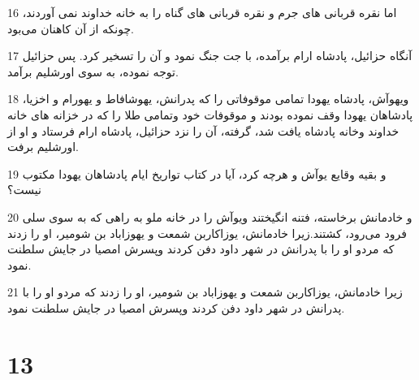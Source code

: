 \par 16 اما نقره قربانی های جرم و نقره قربانی های گناه را به خانه خداوند نمی آوردند، چونکه از آن کاهنان می‌بود.
\par 17 آنگاه حزائیل، پادشاه ارام برآمده، با جت جنگ نمود و آن را تسخیر کرد. پس حزائیل توجه نموده، به سوی اورشلیم برآمد.
\par 18 ویهوآش، پادشاه یهودا تمامی موقوفاتی را که پدرانش، یهوشافاط و یهورام و اخزیا، پادشاهان یهودا وقف نموده بودند و موقوفات خود وتمامی طلا را که در خزانه های خانه خداوند وخانه پادشاه یافت شد، گرفته، آن را نزد حزائیل، پادشاه ارام فرستاد و او از اورشلیم برفت.
\par 19 و بقیه وقایع یوآش و هر‌چه کرد، آیا در کتاب تواریخ ایام پادشاهان یهودا مکتوب نیست؟
\par 20 و خادمانش برخاسته، فتنه انگیختند ویوآش را در خانه ملو به راهی که به سوی سلی فرود می‌رود، کشتند.زیرا خادمانش، یوزاکاربن شمعت و یهوزاباد بن شومیر، او را زدند که مردو او را با پدرانش در شهر داود دفن کردند وپسرش امصیا در جایش سلطنت نمود.
\par 21 زیرا خادمانش، یوزاکاربن شمعت و یهوزاباد بن شومیر، او را زدند که مردو او را با پدرانش در شهر داود دفن کردند وپسرش امصیا در جایش سلطنت نمود.
 
\chapter{13}

